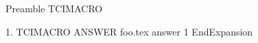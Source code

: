 Preamble
TCIMACRO
\begin{ExerciseList}
\item[1.]
TCIMACRO
ANSWER
foo.tex answer 1
EndExpansion
\end{ExerciseList}
